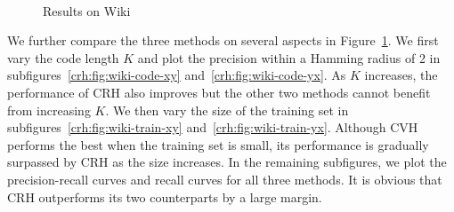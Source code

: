 \begin{figure}[ht]
\begin{center}
{    \begin{minipage}[b]{0.45\linewidth} %
    \end{minipage}}
\\
\subfigure[Recall Curve]{\label{crh:fig:wiki-rec-xy}
    \begin{minipage}[b]{0.45\linewidth} %
        \epsfig{figure=fig/crh/wiki-comp-rec-xy, width=0.8\textwidth}%
    \end{minipage}}
\subfigure[Recall Curve]{\label{crh:fig:wiki-rec-yx}
    \begin{minipage}[b]{0.45\linewidth} %
        \epsfig{figure=fig/crh/wiki-comp-rec-yx, width=0.8\textwidth}%
    \end{minipage}} %
\end{center} \vspace{-0.5cm}
\caption{Results on \mbox{Wiki}}\label{crh:fig:wiki-compare-curve}
\end{figure}

We further compare the three methods on several aspects in Figure~\ref{crh:fig:wiki-compare-curve}. We first vary the code length $K$ and plot the precision within a Hamming radius of 2 in subfigures~\ref{crh:fig:wiki-code-xy} and~\ref{crh:fig:wiki-code-yx}. As $K$ increases, the performance of \mbox{CRH} also improves but the other two methods cannot benefit from increasing $K$. We then vary the size of the training set in subfigures~\ref{crh:fig:wiki-train-xy} and~\ref{crh:fig:wiki-train-yx}. Although \mbox{CVH} performs the best when the training set is small, its performance is gradually surpassed by \mbox{CRH} as the size increases.  In the remaining subfigures, we plot the precision-recall curves and recall curves for all three methods. It is obvious that \mbox{CRH} outperforms its two counterparts by a large margin.



